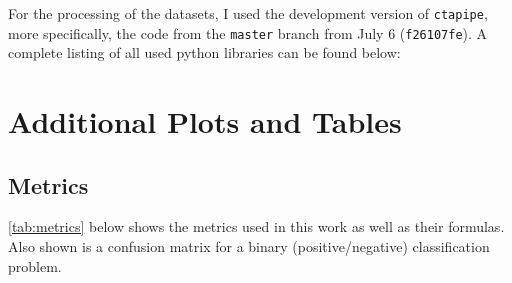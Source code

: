 For the processing of the datasets, I used the development version of \texttt{ctapipe}, more specifically,
the code from the \texttt{master} branch from July 6 (\texttt{f26107fe}). A complete listing of all used python libraries can be found below:
\begin{spacing}{0.5}
    \begin{mdframed}[backgroundcolor=codebg, hidealllines=true, leftmargin=0cm,rightmargin=0cm, skipabove=0pt, innerleftmargin=0,innerrightmargin=0,]
    
    \end{mdframed}
\end{spacing}


\section{Additional Plots and Tables}%
\label{ap:additional_plots_tables}

\subsection{Metrics}%
\label{ap:metrics}
\autoref{tab:metrics} below shows the metrics used in this work as well as their formulas. Also shown is a confusion matrix for
a binary (positive/negative) classification problem.

